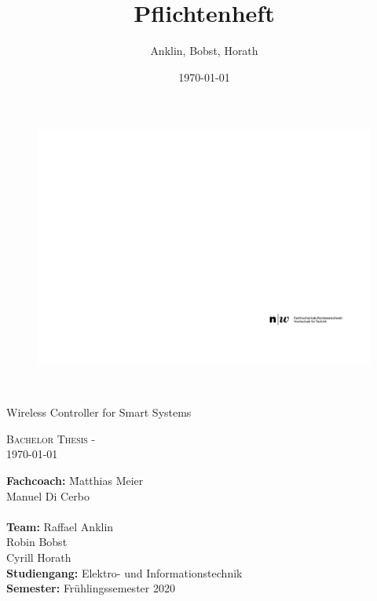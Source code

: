 \documentclass[final]{fhnwreport}       %
\title{Pflichtenheft}  		        %
\author{Anklin, Bobst, Horath}      				    %
\date{\today}          				   %
\begin{document}
\thispagestyle{empty}
	\begin{figure}
		 \vspace*{-\topskip}\vspace*{-\headsep}
		\includegraphics[scale=1]{graphics/fhnw_ht_logo_de.pdf}
	\end{figure}
	\begin{center}
		\vspace*{2cm}
		{\huge{\textbf{\thetitle}}}\\
		\vspace*{1cm}
		
		{\huge{Wireless Controller for Smart Systems}}\\
		\vspace*{0.5cm}
		
		{\scshape\Large Bachelor Thesis - \theauthor \\} \Large{\today}
		\vfill
		
		
		\begin{normalsize}
			{\begin{tabbing}
						
					\textbf{Fachcoach:} \hspace{6cm}\= Matthias Meier\\
					\>Manuel Di Cerbo\\
					
					\\[0.4cm]
					
					\textbf{Team:} \>Raffael Anklin \\ \>Robin Bobst \\ \>Cyrill Horath
					\\[0.8cm]
					\textbf{Studiengang:} \>Elektro- und Informationstechnik
					\\[0.8cm]	\textbf{Semester:} \>Frühlingssemester 2020
			\end{tabbing}}
		\end{normalsize}
		\vfill
	\end{center}
\clearpage
\end{document}
